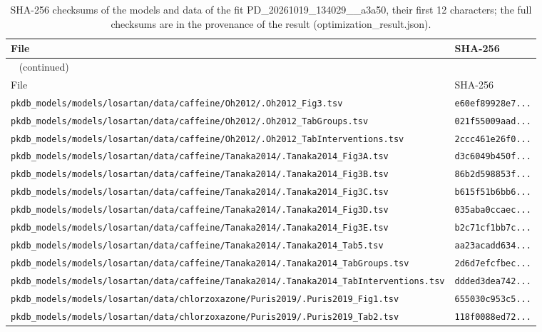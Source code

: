 \begin{longtable}{ll}
\caption{SHA-256 checksums of the models and data of the fit PD\_20261019\_134029\_\_a3a50, their first 12 characters; the full checksums are in the provenance of the result (optimization\_result.json).}\label{tab:checksums:PD_20261019_134029__a3a50} \\
\toprule
File & SHA-256 \\
\midrule
\endfirsthead
\multicolumn{2}{l}{\small\tablename~\thetable{} (continued)} \\
\toprule
File & SHA-256 \\
\midrule
\endhead
\bottomrule
\endlastfoot
\texttt{pkdb\_models/models/losartan/data/caffeine/Oh2012/.Oh2012\_Fig3.tsv} & \texttt{e60ef89928e7...} \\
\texttt{pkdb\_models/models/losartan/data/caffeine/Oh2012/.Oh2012\_TabGroups.tsv} & \texttt{021f55009aad...} \\
\texttt{pkdb\_models/models/losartan/data/caffeine/Oh2012/.Oh2012\_TabInterventions.tsv} & \texttt{2ccc461e26f0...} \\
\texttt{pkdb\_models/models/losartan/data/caffeine/Tanaka2014/.Tanaka2014\_Fig3A.tsv} & \texttt{d3c6049b450f...} \\
\texttt{pkdb\_models/models/losartan/data/caffeine/Tanaka2014/.Tanaka2014\_Fig3B.tsv} & \texttt{86b2d598853f...} \\
\texttt{pkdb\_models/models/losartan/data/caffeine/Tanaka2014/.Tanaka2014\_Fig3C.tsv} & \texttt{b615f51b6bb6...} \\
\texttt{pkdb\_models/models/losartan/data/caffeine/Tanaka2014/.Tanaka2014\_Fig3D.tsv} & \texttt{035aba0ccaec...} \\
\texttt{pkdb\_models/models/losartan/data/caffeine/Tanaka2014/.Tanaka2014\_Fig3E.tsv} & \texttt{b2c71cf1bb7c...} \\
\texttt{pkdb\_models/models/losartan/data/caffeine/Tanaka2014/.Tanaka2014\_Tab5.tsv} & \texttt{aa23acadd634...} \\
\texttt{pkdb\_models/models/losartan/data/caffeine/Tanaka2014/.Tanaka2014\_TabGroups.tsv} & \texttt{2d6d7efcfbec...} \\
\texttt{pkdb\_models/models/losartan/data/caffeine/Tanaka2014/.Tanaka2014\_TabInterventions.tsv} & \texttt{ddded3dea742...} \\
\texttt{pkdb\_models/models/losartan/data/chlorzoxazone/Puris2019/.Puris2019\_Fig1.tsv} & \texttt{655030c953c5...} \\
\texttt{pkdb\_models/models/losartan/data/chlorzoxazone/Puris2019/.Puris2019\_Tab2.tsv} & \texttt{118f0088ed72...} \\

\end{longtable}
